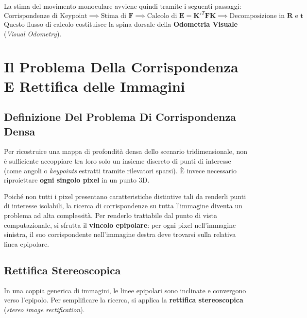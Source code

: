 ﻿\documentclass[11pt, a4paper]{article}
\begin{document}
La stima del movimento monoculare avviene quindi tramite i seguenti passaggi:
\[ \text{Corrispondenze di Keypoint} \implies \text{Stima di } \bm{F} \implies \text{Calcolo di } \bm{E} = \bm{K}'^T \bm{F}\bm{K} \implies \text{Decomposizione in } \bm{R} \text{ e } \bm{t} \]
Questo flusso di calcolo costituisce la spina dorsale della \textbf{Odometria Visuale} (\emph{Visual Odometry}).

\newpage

\section{Il Problema Della Corrispondenza E Rettifica delle Immagini}

\subsection{Definizione Del Problema Di Corrispondenza Densa}

Per ricostruire una mappa di profondità densa dello scenario tridimensionale, non è sufficiente accoppiare tra loro solo un insieme discreto di punti di interesse (come angoli o \emph{keypoints} estratti tramite rilevatori sparsi). È invece necessario riproiettare \textbf{ogni singolo pixel} in un punto 3D.

Poiché non tutti i pixel presentano caratteristiche distintive tali da renderli punti di interesse isolabili, la ricerca di corrispondenze su tutta l'immagine diventa un problema ad alta complessità. Per renderlo trattabile dal punto di vista computazionale, si sfrutta il \textbf{vincolo epipolare}: per ogni pixel nell'immagine sinistra, il suo corrispondente nell'immagine destra deve trovarsi sulla relativa linea epipolare.

\subsection{Rettifica Stereoscopica}

In una coppia generica di immagini, le linee epipolari sono inclinate e convergono verso l'epipolo. Per semplificare la ricerca, si applica la \textbf{rettifica stereoscopica} (\emph{stereo image rectification}).

\end{document}
